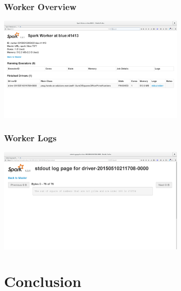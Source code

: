 \documentclass[slidetop,9pt,utf8]{beamer}
\begin{document}
\begin{frame}

  \frametitle{Worker Overview}

  \includegraphics[width=345px]{images/spark_webapp_worker_overview.png}

\end{frame}

\begin{frame}

  \frametitle{Worker Logs}

  \includegraphics[width=345px]{images/spark_webapp_worker_logs.png}

\end{frame}

%
%
%
%

\section{Conclusion}
\end{document}
